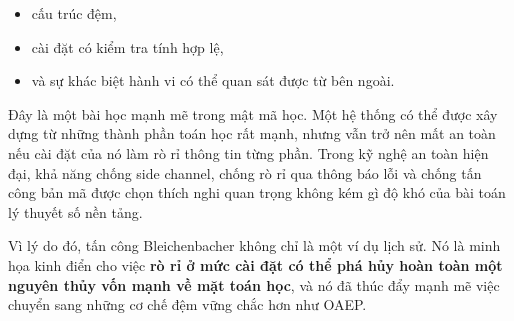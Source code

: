 \begin{itemize}
\item cấu trúc đệm,
\item cài đặt có kiểm tra tính hợp lệ,
\item và sự khác biệt hành vi có thể quan sát được từ bên ngoài.
\end{itemize}

Đây là một bài học mạnh mẽ trong mật mã học. Một hệ thống có thể được xây dựng từ những thành phần toán học rất mạnh, nhưng vẫn trở nên mất an toàn nếu cài đặt của nó làm rò rỉ thông tin từng phần. Trong kỹ nghệ an toàn hiện đại, khả năng chống side channel, chống rò rỉ qua thông báo lỗi và chống tấn công bản mã được chọn thích nghi quan trọng không kém gì độ khó của bài toán lý thuyết số nền tảng.

Vì lý do đó, tấn công Bleichenbacher không chỉ là một ví dụ lịch sử. Nó là minh họa kinh điển cho việc \textbf{rò rỉ ở mức cài đặt có thể phá hủy hoàn toàn một nguyên thủy vốn mạnh về mặt toán học}, và nó đã thúc đẩy mạnh mẽ việc chuyển sang những cơ chế đệm vững chắc hơn như OAEP.
